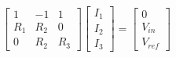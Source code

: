 \documentclass{article}
\begin{document}
\thispagestyle{empty}

$$
\begin{bmatrix}
1 & -1 & 1 \\
R_{1} & R_{2} & 0 \\
0 & R_{2} & R_{3}
\end{bmatrix}
\begin{bmatrix}
I_1\\ I_2\\ I_3
\end{bmatrix}
=
\begin{bmatrix}
0 \\ V_{in} \\ V_{ref}
\end{bmatrix}
$$
\end{document}
